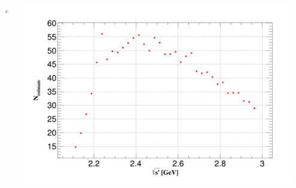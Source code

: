 \documentclass[aspectratio=169]{ctexbeamer}
\begin{document}
\begin{frame}
\begin{columns}[t]
\begin{column}{1.5\textheight}
\begin{columns}
\begin{column}{0.3\textwidth}
        \end{column}
        \begin{column}{0.05\textwidth}
          \centering
          $=$
        \end{column}
        \begin{column}{0.3\textwidth}
          \centering
          \includegraphics[width=\textwidth]{figures/Nes.png}
        \end{column}
      \end{columns}
    \end{column}
  \end{columns}

  \vspace{0.5cm}


\end{frame}
\end{document}
